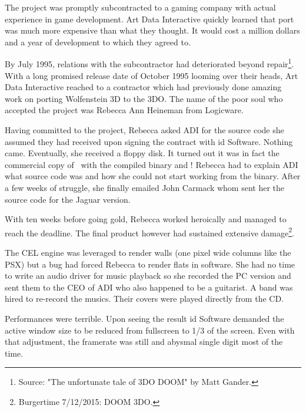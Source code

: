 The project was promptly subcontracted to a gaming company with actual experience in game development. Art Data Interactive quickly learned that port was much more expensive than what they thought. It would cost a million dollars and a year of development to which they agreed to.\\
\par
By July 1995, relations with the subcontractor had deteriorated beyond repair\footnote{Source: "The unfortunate tale of 3DO DOOM" by Matt Gander.}. With a long promised release date of October 1995 looming over their heads, Art Data Interactive reached to a contractor which had previously done  amazing work on porting Wolfenstein 3D to the 3DO. The name of the poor soul who accepted the project was Rebecca Ann Heineman from Logicware.\\
\par
Having committed to the project, Rebecca asked ADI for the source code she assumed they had received upon signing the contract with id Software. Nothing came. Eventually, she received a floppy disk. It turned out it was in fact the commercial copy of \doom~with the compiled binary  and ! Rebecca had to explain ADI what source code was and how she could not start working from the binary. After a few weeks of struggle, she finally emailed John Carmack whom sent her the source code for the Jaguar version.\\
\par
 With ten weeks before going gold, Rebecca worked heroically and managed to reach the deadline. The final product however had sustained extensive damage\footnote{Burgertime 7/12/2015: DOOM 3DO.}.\\
\par
{}
\par
The CEL engine was leveraged to render walls (one pixel wide columns like the PSX) but a bug had forced Rebecca to render flats in software. She had no time to write an audio driver for music playback so she recorded the PC version and sent them to the CEO of ADI who also happened to be a guitarist. A band was hired to re-record the musics. Their covers were played directly from the CD.\\ 
\par
 Performances were terrible. Upon seeing the result id Software demanded the active window size to be reduced from fullscreen to 1/3 of the screen. Even with that adjustment, the framerate was still and abysmal single digit most of the time.\\
